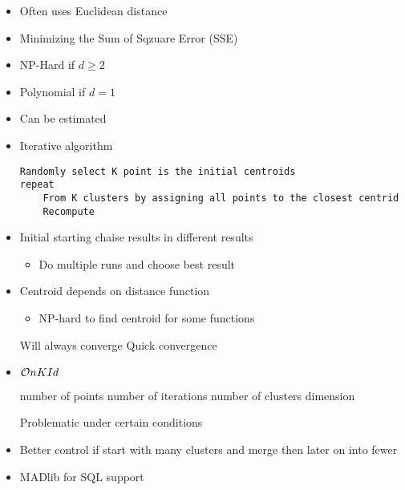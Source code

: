 \begin{itemize}
\begin{itemize}
                \item Often uses Euclidean distance
                \item Minimizing the Sum of Sqzuare Error (SSE)
                \item NP-Hard if $d \ge 2$
                \item Polynomial if $d = 1$
                \item Can be estimated
                \item Iterative algorithm
\begin{verbatim}
Randomly select K point is the initial centroids
repeat
    From K clusters by assigning all points to the closest centrid
    Recompute
\end{verbatim}
                \item Initial starting chaise results in different results
                    \begin{itemize}
                        \item Do multiple runs and choose best result
                    \end{itemize}
                \item Centroid depends on distance function
                    \begin{itemize}
                        \item NP-hard to find centroid for some functions
                    \end{itemize}
                \ipro Will always converge
                \ipro Quick convergence
                \item $\mathcal{O}{nKId}$
                    \begin{itemize}
                         number of points
                         number of iterations
                         number of clusters
                         dimension
                    \end{itemize}
                \icon Problematic under certain conditions
                \item Better control if start with many clusters and merge then later on into fewer
                \item MADlib for SQL support
            \end{itemize}
\end{itemize}


